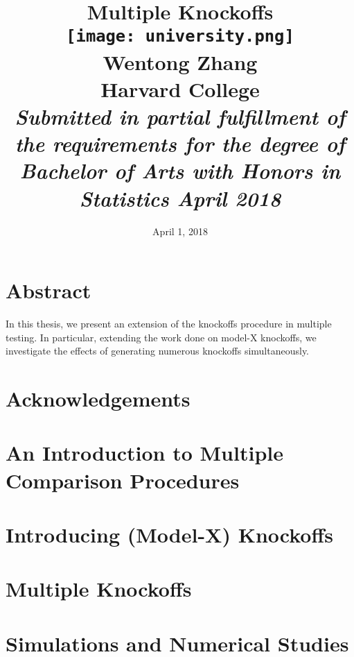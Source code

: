 \documentclass[12pt,reqno]{report}
\title{
	{\Huge \bf Multiple Knockoffs}\\ \vspace*{1cm}
	{\texttt{[image: university.png]}} \\
	{\huge Wentong Zhang \\ \LARGE Harvard College}\\ \vspace*{1cm}
	{\Large \it Submitted in partial fulfillment of the
requirements for the degree of Bachelor
of Arts with Honors in Statistics
April 2018}
}
\date{\Large April 1, 2018}
\theoremstyle{definition}
\numberwithin{equation}{section}
\begin{document}
\maketitle

\chapter*{Abstract}
In this thesis, we present an extension of the knockoffs procedure in multiple testing. In particular, extending the work done on model-X knockoffs, we investigate the effects of generating numerous knockoffs simultaneously. 

\chapter*{Acknowledgements}
% 



\doublespacing
\tableofcontents
\onehalfspacing

\chapter{An Introduction to Multiple Comparison Procedures}


\chapter{Introducing (Model-X) Knockoffs}


\chapter{Multiple Knockoffs}


\chapter{Simulations and Numerical Studies}



\end{document}
